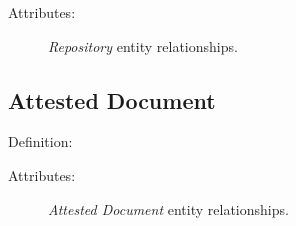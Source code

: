 \vspace{1em}
\noindent Attributes:

\begin{figure}[ht]
    \begin{center}
        
    \end{center}
\label{fig:RepositoryER}
\caption{\textit{Repository} entity relationships.}
\end{figure}


\subsection{Attested Document}

Definition: 

\vspace{1em}
\noindent Attributes:

\begin{figure}[ht]
    \begin{center}
        
    \end{center}
\label{fig:AttestedDocumentER}
\caption{\textit{Attested Document} entity relationships.}
\end{figure}

